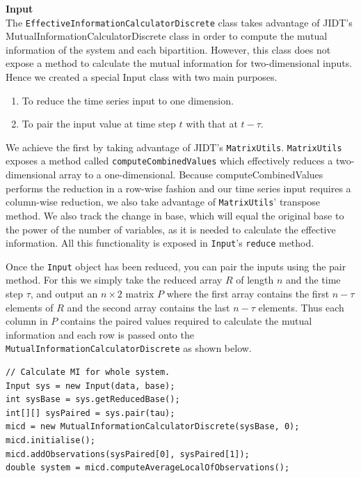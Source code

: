 \documentclass[a4paper,11pt]{article}
\begin{document}
\noindent \textbf{Input}\\

\noindent The \texttt{EffectiveInformationCalculatorDiscrete} class takes advantage of JIDT's MutualInformationCalculatorDiscrete class in order to compute the mutual information of the system and each bipartition. However, this class does not expose a method to calculate the mutual information for two-dimensional inputs. Hence we created a special Input class with two main purposes.

\begin{enumerate}
\item{To reduce the time series input to one dimension.}
\item{To pair the input value at time step $t$ with that at $t-\tau$.}
\end{enumerate}

We achieve the first by taking advantage of JIDT's \texttt{MatrixUtils}. \texttt{MatrixUtils} exposes a method called \texttt{computeCombinedValues} which effectively reduces a two-dimensional array to a one-dimensional. Because computeCombinedValues performs the reduction in a row-wise fashion and our time series input requires a column-wise reduction, we also take advantage of \texttt{MatrixUtils}' transpose method. We also track the change in base, which will equal the original base to the power of the number of variables, as it is needed to calculate the effective information. All this functionality is exposed in \texttt{Input}'s \texttt{reduce} method.

Once the \texttt{Input} object has been reduced, you can pair the inputs using the pair method. For this we simply take the reduced array $R$ of length $n$ and the time step $\tau$, and output an $n \times 2$ matrix $P$ where the first array contains the first $n - \tau$ elements of $R$ and the second array contains the last $n - \tau$ elements. Thus each column in $P$ contains the paired values required to calculate the mutual information and each row is passed onto the \texttt{MutualInformationCalculatorDiscrete} as shown below.

\begin{verbatim}
// Calculate MI for whole system.
Input sys = new Input(data, base);
int sysBase = sys.getReducedBase();
int[][] sysPaired = sys.pair(tau);
micd = new MutualInformationCalculatorDiscrete(sysBase, 0);
micd.initialise();
micd.addObservations(sysPaired[0], sysPaired[1]);
double system = micd.computeAverageLocalOfObservations();
\end{verbatim}
\end{document}
